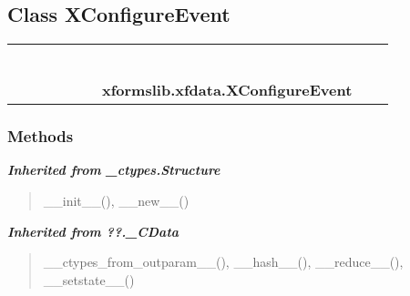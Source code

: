 
\subsection{Class XConfigureEvent}

    \label{xformslib:xfdata:XConfigureEvent}
\begin{tabular}{cccccccccc}
\multicolumn{2}{r}{\settowidth{\BCL}{object}\multirow{2}{\BCL}{object}}
&&
&&
&&
  \\\cline{3-3}
  &&\multicolumn{1}{c|}{}
&&
&&
&&
  \\
\multicolumn{4}{r}{\settowidth{\BCL}{??.\_CData}\multirow{2}{\BCL}{??.\_CData}}
&&
&&
  \\\cline{5-5}
  &&&&\multicolumn{1}{c|}{}
&&
&&
  \\
\multicolumn{6}{r}{\settowidth{\BCL}{\_ctypes.Structure}\multirow{2}{\BCL}{\_ctypes.Structure}}
&&
  \\\cline{7-7}
  &&&&&&\multicolumn{1}{c|}{}
&&
  \\
&&&&&&\multicolumn{2}{l}{\textbf{xformslib.xfdata.XConfigureEvent}}
\end{tabular}



  \subsubsection{Methods}


\large{\textbf{\textit{Inherited from \_ctypes.Structure}}}

\begin{quote}
\_\_init\_\_(), \_\_new\_\_()
\end{quote}

\large{\textbf{\textit{Inherited from ??.\_CData}}}

\begin{quote}
\_\_ctypes\_from\_outparam\_\_(), \_\_hash\_\_(), \_\_reduce\_\_(), \_\_setstate\_\_()
\end{quote}

